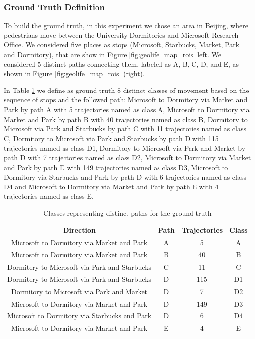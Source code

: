 \documentclass[12pt]{article}
\begin{document}
\subsubsection{Ground Truth Definition}
To build the ground truth, in this experiment we chose an area in Beijing, where pedestrians move between the University Dormitories and Microsoft Research Office. We considered five places as stops (Microsoft, Starbucks, Market, Park and Dormitory), that are show in Figure \ref{fig:geolife_map_rois} left. We considered 5 distinct paths connecting them, labeled as A, B, C, D, and E, as shown in Figure \ref{fig:geolife_map_rois} (right).

In Table \ref{tab:geolife_dataset} we define as ground truth 8 distinct classes of movement based on the sequence of stops and the followed path: Microsoft to Dormitory via Market and Park by path A with 5 trajectories named as class A, Microsoft to Dormitory via Market and Park by path B with 40 trajectories named as class B, Dormitory to Microsoft via Park and Starbucks by path C with 11 trajectories named as class C, Dormitory to Microsoft via Park and Starbucks by path D with 115 trajectories named as class D1, Dormitory to Microsoft via Park and Market by path D with 7 trajectories named as class D2, Microsoft to Dormitory via Market and Park by path D with 149 trajectories named as class D3, Microsoft to Dormitory via Starbucks and Park by path D with 6 trajectories named as class D4 and Microsoft to Dormitory via Market and Park by path E with 4 trajectories named as class E.

\begin{table}[ht!]
\scriptsize
  \centering
  \begin{tabular}{|c|c|c|c|}
  	\hline
 Direction & Path &  Trajectories & Class \\
  	\hline
Microsoft to Dormitory via Market and Park& A & 5 & A \\
Microsoft to Dormitory via Market and Park& B & 40&B \\
Dormitory to Microsoft via Park and Starbucks& C & 11&C \\
Dormitory to Microsoft via Park and Starbucks& D & 115&D1 \\
Dormitory to Microsoft via Park and Market& D & 7&D2 \\
Microsoft to Dormitory via Market and Park& D & 149&D3 \\
Microsoft to Dormitory via Starbucks and Park& D & 6&D4 \\
Microsoft to Dormitory via Market and Park& E & 4& E \\
    \hline
  \end{tabular}
  \caption{Classes representing distinct paths for the ground truth}
  \label{tab:geolife_dataset}
\end{table}
\end{document}
